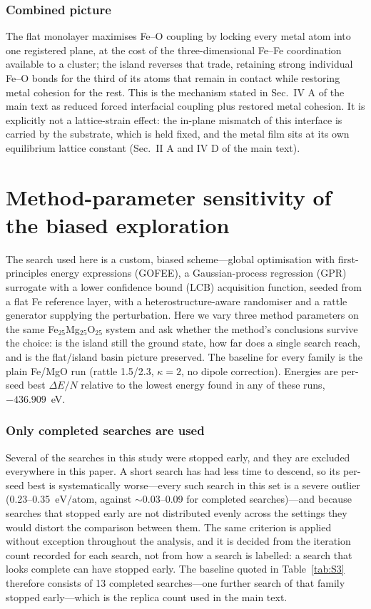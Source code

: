 \documentclass[10pt]{article}
\newcommand{\eVA}{\ensuremath{\text{eV/atom}}}
\begin{document}
\subsubsection{Combined picture} The flat monolayer maximises Fe--O coupling by locking every metal atom
into one registered plane, at the cost of the three-dimensional Fe--Fe coordination available to a
cluster; the island reverses that trade, retaining strong individual Fe--O bonds for the third of its
atoms that remain in contact while restoring metal cohesion for the rest. This is the mechanism
stated in Sec.~IV A of the main text as reduced forced interfacial coupling plus restored
metal cohesion. It is explicitly not a lattice-strain effect: the in-plane mismatch of this
interface is carried by the substrate, which is held fixed, and the metal film sits at its own
equilibrium lattice constant (Sec.~II A and IV D of the main text).

\section{Method-parameter sensitivity of the biased exploration}
\label{sec:S3}

The search used here is a custom, biased scheme---global optimisation with first-principles energy
expressions (GOFEE), a Gaussian-process regression (GPR) surrogate with a lower confidence bound
(LCB) acquisition function, seeded from a flat Fe reference layer, with a heterostructure-aware
randomiser and a rattle generator supplying the perturbation. Here we vary three method parameters on the same
Fe$_{25}$Mg$_{25}$O$_{25}$ system and ask whether the method's conclusions survive the choice: is the
island still the ground state, how far does a single search reach, and is the flat/island basin
picture preserved. The baseline for every family is the plain Fe/MgO run (rattle 1.5/2.3,
$\kappa = 2$, no dipole correction). Energies are per-seed best $\Delta E/N$ relative to the lowest
energy found in any of these runs, $-436.909$~eV.

\subsubsection{Only completed searches are used} Several of the searches in this study were stopped
early, and they are excluded everywhere in this paper. A short search has had less time to descend,
so its per-seed best is systematically worse---every such search in this set is a severe outlier
(0.23--0.35~\eVA, against $\sim$0.03--0.09 for completed searches)---and because searches that
stopped early are not distributed evenly across the settings they would distort the comparison
between them. The same criterion is applied without exception throughout the analysis, and it is
decided from the iteration count recorded for each search, not from how a search is
labelled: a search that looks complete can have stopped early. The baseline quoted in
Table~\ref{tab:S3} therefore consists of 13 completed searches---one further search of that
family stopped early---which is the replica count used in the main text.
\end{document}
